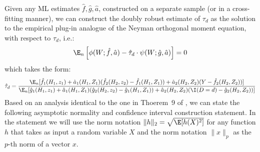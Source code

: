 Given any ML estimates $\hat{f}, \hat{g}, \hat{a}$, constructed on a separate sample (or in a cross-fitting manner), we can construct the doubly robust estimate of $\tau_d$ as the solution to the empirical plug-in analogue of the Neyman orthogonal moment equation, with respect to $\hat{\tau}_d$, i.e.:
\begin{align*}
    \E_n\left[{\phi}(W;\hat{f}, \hat{a}) - \hat{\tau}_d\cdot  {\psi}(W; \hat{g}, \hat{a})\right] = 0
\end{align*}
which takes the form:
\begin{align}\label{eqn:estimate}
    \hat{\tau}_d = \frac{\E_n[\hat{f}_1(H_1, z_1) + \hat{a}_1(H_1, Z_1) (\hat{f}_2(H_2, z_2) - \hat{f}_1(H_1, Z_1)) + \hat{a}_2(H_2, Z_2)(Y - \hat{f}_2(H_2, Z_2))]}{\E_n[\hat{g}_1(H_1, z_1) + \hat{a}_1(H_1, Z_1) (\hat{g}_2(H_2, z_2) - \hat{g}_1(H_1, Z_1)) + \hat{a}_2(H_2, Z_2)(\I(D=d) - \hat{g}_2(H_2, Z_2))]}
\end{align}
Based on an analysis identical to the one in Thoerem~9 of \cite{chernozhukov2022automatic}, we can state the following asymptotic normality and confidence interval construction statement. In the statement we will use the norm notation $\|h\|_2 = \sqrt{\E[h(X)^2]}$ for any function $h$ that takes as input a random variable $X$ and the norm notation $\|x\|_p$ as the $p$-th norm of a vector $x$. 
